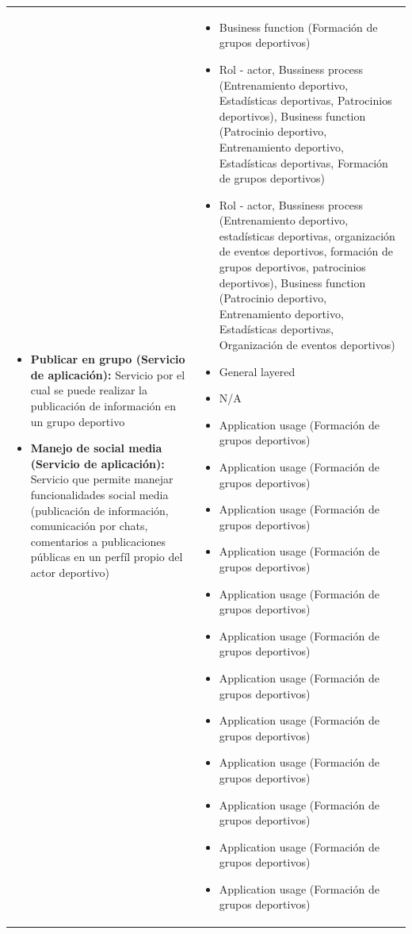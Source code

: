 \begin{table}[!htb]
\begin{center}
{\begin{tabular}{|p{7cm}|p{4cm}|}
\begin{itemize}
				\item \textbf{Publicar en grupo (Servicio de aplicación):} Servicio por el cual se puede realizar la publicación de información en un grupo deportivo
				\item \textbf{Manejo de social media (Servicio de aplicación):} Servicio que permite manejar funcionalidades social media (publicación de información, comunicación por chats, comentarios a publicaciones públicas en un perfíl propio del actor deportivo)
			\end{itemize} 
			&
			\begin{itemize}
				\item Business function (Formación de grupos deportivos)
				\item Rol - actor, Bussiness process (Entrenamiento deportivo, Estadísticas deportivas, Patrocinios deportivos), Business function (Patrocinio deportivo, Entrenamiento deportivo, Estadísticas deportivas, Formación de grupos deportivos)
				\item Rol - actor, Bussiness process (Entrenamiento deportivo, estadísticas deportivas, organización de eventos deportivos, formación de grupos deportivos, patrocinios deportivos), Business function (Patrocinio deportivo, Entrenamiento deportivo, Estadísticas deportivas, Organización de eventos deportivos)
				\item General layered
				\item N/A
				\item Application usage (Formación de grupos deportivos)
				\item Application usage (Formación de grupos deportivos)
				\item Application usage (Formación de grupos deportivos)
				\item Application usage (Formación de grupos deportivos)
				\item Application usage (Formación de grupos deportivos)
				\item Application usage (Formación de grupos deportivos)
				\item Application usage (Formación de grupos deportivos)
				\item Application usage (Formación de grupos deportivos)
				\item Application usage (Formación de grupos deportivos)
				\item Application usage (Formación de grupos deportivos)
				\item Application usage (Formación de grupos deportivos)
				\item Application usage (Formación de grupos deportivos)

\end{itemize}
\end{tabular}}
\end{center}
\end{table}
